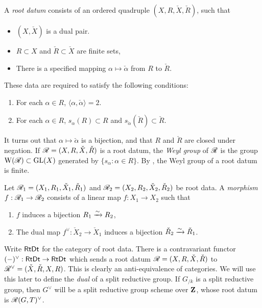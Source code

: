 \begin{definition}
A \emph{root datum} consists of an ordered quadruple $(X,R,\check X,\check R)$, 
such that 
\begin{itemize}
  \item $(X,\check X)$ is a dual pair. 
  \item $R\subset X$ and $\check R\subset \check X$ are finite sets, 
  \item There is a specified mapping $\alpha\mapsto \check\alpha$ from $R$ to 
    $\check R$. 
\end{itemize}
These data are required to satisfy the following conditions:
\begin{enumerate}
  \item For each $\alpha\in R$, $\langle\alpha,\check\alpha\rangle=2$. 
  \item For each $\alpha\in R$, $s_\alpha(R)\subset R$ and 
    $s_{\check\alpha}(\check R)\subset \check R$. 
\end{enumerate}
\end{definition}

It turns out that $\alpha\mapsto \check\alpha$ is a bijection, and that 
$R$ and $\check R$ are closed under negation. If $\mathscr{R}=(X,R,\check X,\check R)$ 
is a root datum, the \emph{Weyl group} of $\mathscr{R}$ is the group  
$\operatorname{W}(\mathscr{R})\subset \operatorname{GL}(X)$ generated by $\{s_\alpha:\alpha\in R\}$. By 
\cite[XXI 1.2.8]{sga3-iii}, the Weyl group of a root datum is finite. 

\begin{definition}
Let $\mathscr{R}_1=(X_1,R_1,\check X_1,\check R_1)$ and 
$\mathscr{R}_2=(X_2,R_2,\check X_2,\check R_2)$ be root data. A \emph{morphism} 
$f:\mathscr{R}_1\to \mathscr{R}_2$ consists of a linear map $f:X_1\to X_2$ such that 
\begin{enumerate}
  \item $f$ induces a bijection $R_1\xrightarrow\sim R_2$, 
  \item The dual map $f^\vee:\check X_2\to \check X_1$ induces a bijection 
    $\check R_2\xrightarrow\sim \check R_1$. 
\end{enumerate}
\end{definition}

Write $\mathsf{RtDt}$ for the category of root data. There is a contravariant 
functor $(-)^\vee:\mathsf{RtDt}\to \mathsf{RtDt}$ which sends a root datum 
$\mathscr{R}=(X,R,\check X,\check R)$ to $\mathscr{R}^\vee=(\check X,\check R,X,R)$. This is 
clearly an anti-equivalence of categories. We will use this later to define 
the \emph{dual} of a split reductive group. If $G_{/k}$ is a split reductive 
group, then $G^\vee$ will be a split reductive group scheme over $\mathbf{Z}$, whose 
root datum is $\mathscr{R}(G,T)^\vee$. 





